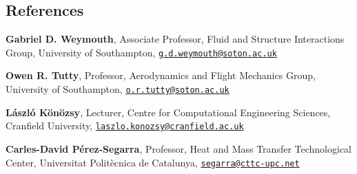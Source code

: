 \documentclass[margin,line,pifont,palatino,courier]{res}
\begin{document}
\begin{resume}
\section{\sc References}
{\bf Gabriel D. Weymouth}, Associate Professor, Fluid and Structure Interactions Group, University of Southampton, \href{mailto:g.d.weymouth@soton.ac.uk}{\texttt{g.d.weymouth@soton.ac.uk}}

{\bf Owen R. Tutty}, Professor, Aerodynamics and Flight Mechanics Group, University of Southampton, \href{mailto:o.r.tutty@soton.ac.uk}{\texttt{o.r.tutty@soton.ac.uk}}

{\bf L\'{a}szl\'{o} K\"{o}n\"{o}zsy}, Lecturer, Centre for Computational Engineering Sciences, Cranfield University, \href{mailto:laszlo.konozsy@cranfield.ac.uk}{\texttt{laszlo.konozsy@cranfield.ac.uk}}

{\bf Carles-David P\'{e}rez-Segarra}, Professor, Heat and Mass Transfer Technological Center, Universitat Polit\`{e}cnica de Catalunya, \href{mailto:segarra@cttc-upc.net}{\texttt{segarra@cttc-upc.net}}
\end{resume}
\end{document}
